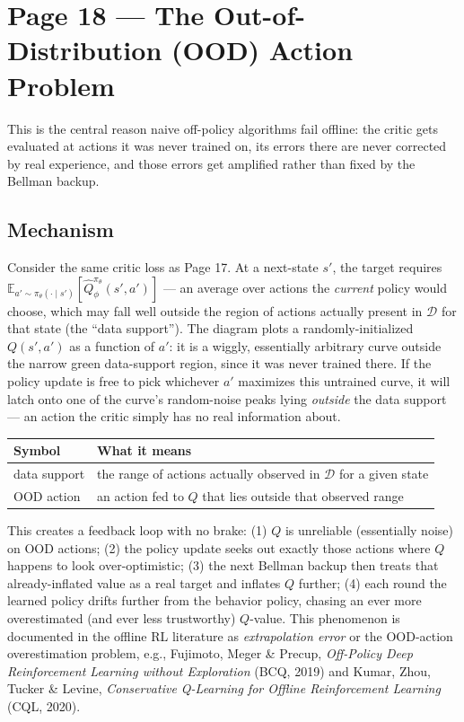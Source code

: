 \documentclass[11pt]{article}
\begin{document}
\section*{Page 18 --- The Out-of-Distribution (OOD) Action Problem}

This is the central reason naive off-policy algorithms fail offline: the critic gets evaluated at actions it was never trained on, its errors there are never corrected by real experience, and those errors get amplified rather than fixed by the Bellman backup.

\subsection*{Mechanism}

Consider the same critic loss as Page 17. At a next-state $s'$, the target requires $\mathbb{E}_{a'\sim\pi_\theta(\cdot\mid s')}[\hat Q_\phi^{\pi_\theta}(s',a')]$ --- an average over actions the \emph{current} policy would choose, which may fall well outside the region of actions actually present in $\mathcal{D}$ for that state (the ``data support''). The diagram plots a randomly-initialized $Q(s',a')$ as a function of $a'$: it is a wiggly, essentially arbitrary curve outside the narrow green data-support region, since it was never trained there. If the policy update is free to pick whichever $a'$ maximizes this untrained curve, it will latch onto one of the curve's random-noise peaks lying \emph{outside} the data support --- an action the critic simply has no real information about.

\begin{center}
\begin{tabular}{@{}ll@{}}
\toprule
Symbol & What it means \\
\midrule
data support & the range of actions actually observed in $\mathcal{D}$ for a given state \\
OOD action & an action fed to $Q$ that lies outside that observed range \\
\bottomrule
\end{tabular}
\end{center}

This creates a feedback loop with no brake: (1) $Q$ is unreliable (essentially noise) on OOD actions; (2) the policy update seeks out exactly those actions where $Q$ happens to look over-optimistic; (3) the next Bellman backup then treats that already-inflated value as a real target and inflates $Q$ further; (4) each round the learned policy drifts further from the behavior policy, chasing an ever more overestimated (and ever less trustworthy) $Q$-value. This phenomenon is documented in the offline RL literature as \emph{extrapolation error} or the OOD-action overestimation problem, e.g., Fujimoto, Meger \& Precup, \emph{Off-Policy Deep Reinforcement Learning without Exploration} (BCQ, 2019) and Kumar, Zhou, Tucker \& Levine, \emph{Conservative Q-Learning for Offline Reinforcement Learning} (CQL, 2020).
\end{document}
